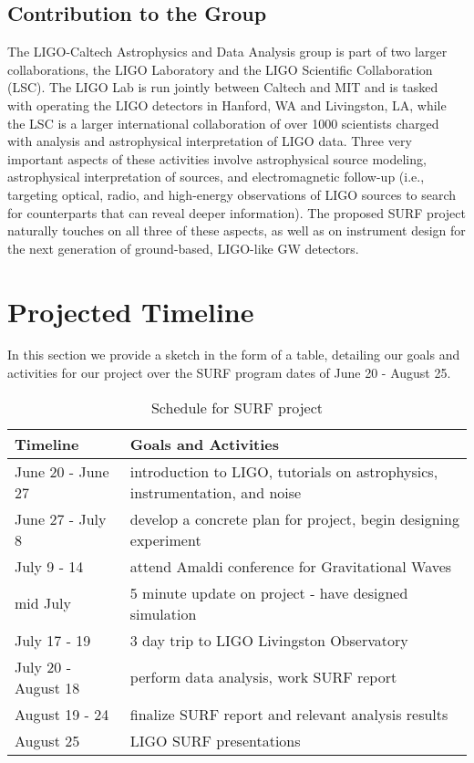 \documentclass{article}
\begin{document}
\subsection*{Contribution to the Group}

	The LIGO-Caltech Astrophysics and Data Analysis group is part of two larger collaborations, the LIGO Laboratory and the LIGO Scientific Collaboration (LSC). The LIGO Lab is run jointly between Caltech and MIT and is tasked with operating the LIGO detectors in Hanford, WA and Livingston, LA, while the LSC is a larger international collaboration of over 1000 scientists charged with analysis and astrophysical interpretation of LIGO data. Three very important aspects of these activities involve astrophysical source modeling, astrophysical interpretation of sources, and electromagnetic follow-up (i.e., targeting optical, radio, and high-energy observations of LIGO sources to search for counterparts that can reveal deeper information). The proposed SURF project naturally touches on all three of these aspects, as well as on instrument design for the next generation of ground-based, LIGO-like GW detectors.

\section{Projected Timeline}
In this section we provide a sketch in the form of a table, detailing our goals and activities for our project over the SURF program dates of June 20 - August 25. \\

\begin{table} [ht]
\caption{Schedule for SURF project}
\begin{tabular}{ p{3cm} p{10cm} }
 \hline
\centering Timeline & Goals and Activities \\ [0.5ex] 
 \hline
 \hline
June 20 - June 27 & introduction to LIGO, tutorials on astrophysics, instrumentation, and noise \\
June 27 - July 8 & develop a concrete plan for project, begin designing experiment \\
July 9 - 14 & attend Amaldi conference for Gravitational Waves \\
mid July & 5 minute update on project - have designed simulation \\
July 17 - 19 & 3 day trip to LIGO Livingston Observatory \\
July 20 - August 18 & perform data analysis, work SURF report \\
August 19 - 24 & finalize SURF report and relevant analysis results \\  
August 25 & LIGO SURF presentations \\
 \hline
\end{tabular}
\end{table}
\end{document}
